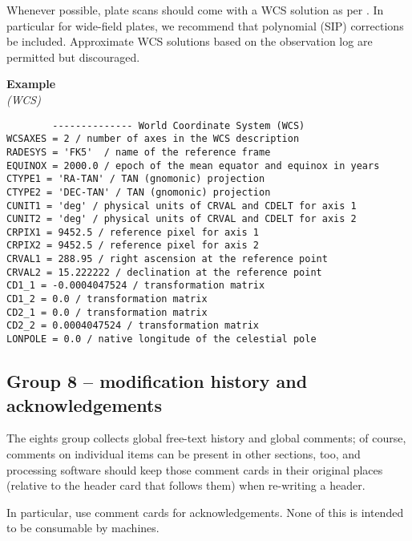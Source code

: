 \documentclass[11pt]{ivoa}
\newenvironment{fitsexample}[1]
{\bigskip\noindent\textbf{Example}\\\textit{(#1\smallskip)}}
{\medskip}
\begin{document}
Whenever possible, plate scans should come with a WCS solution as per
\citet{2002A&A...395.1077C}.  In particular for wide-field plates, we
recommend that polynomial (SIP) corrections be included.  Approximate
WCS solutions based on the observation log are permitted but
discouraged.

\begin{fitsexample}{WCS}
\begin{lstlisting}
        -------------- World Coordinate System (WCS)
WCSAXES = 2 / number of axes in the WCS description
RADESYS = 'FK5'  / name of the reference frame
EQUINOX = 2000.0 / epoch of the mean equator and equinox in years
CTYPE1 = 'RA-TAN' / TAN (gnomonic) projection
CTYPE2 = 'DEC-TAN' / TAN (gnomonic) projection
CUNIT1 = 'deg' / physical units of CRVAL and CDELT for axis 1
CUNIT2 = 'deg' / physical units of CRVAL and CDELT for axis 2
CRPIX1 = 9452.5 / reference pixel for axis 1
CRPIX2 = 9452.5 / reference pixel for axis 2
CRVAL1 = 288.95 / right ascension at the reference point
CRVAL2 = 15.222222 / declination at the reference point
CD1_1 = -0.0004047524 / transformation matrix
CD1_2 = 0.0 / transformation matrix
CD2_1 = 0.0 / transformation matrix
CD2_2 = 0.0004047524 / transformation matrix
LONPOLE = 0.0 / native longitude of the celestial pole
\end{lstlisting}
\end{fitsexample}


\subsection{Group 8 – modification history and acknowledgements}

The eights group collects global free-text history and global comments; of
course, comments on individual items can be present in other sections,
too, and processing software should keep those comment cards in their
original places (relative to the header card that follows them) when
re-writing a header.

In particular, use comment cards for acknowledgements.  None of this is
intended to be consumable by machines.
\end{document}
